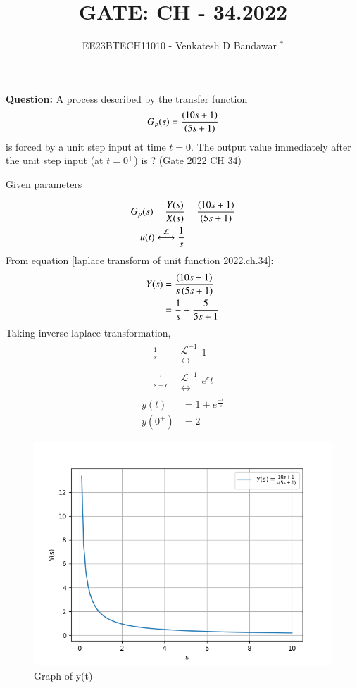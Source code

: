 \documentclass[journal,12pt,twocolumn]{IEEEtran}
\theoremstyle{remark}
\begin{document}

\vspace{3cm}

\title{GATE: CH - 34.2022}
\author{EE23BTECH11010 - Venkatesh D Bandawar $^{*}$%
}
\maketitle
\bigskip


\textbf{Question:} A process described by the transfer function
\begin{align}
    G_p(s) = \frac{\left(10s+1\right)}{\left(5s+1\right)} \nonumber
\end{align}
is forced by a unit step input at time $t = 0$. The output value immediately after the unit step input (at $t = 0^+$) is ? \hfill(Gate 2022 CH 34)\\
\solution
\begin{table}[!h] 
\centering

\caption{Given parameters}
\label{given parameters list.gate.2022.ch.34}
\end{table}
\begin{align}
    G_p(s) = \frac{Y(s)}{X(s)} &= \frac{\brak{10s+1}}{\brak{5s+1}}\\
    u(t) \system{\mathcal{L}} \frac{1}{s} \label{laplace transform of unit function 2022.ch.34}
\end{align}
From equation \eqref{laplace transform of unit function 2022.ch.34}:
\begin{align}
    Y(s) &= \frac{\left(10s+1\right)}{s\left(5s+1\right)}\\
    &= \frac{1}{s} + \frac{5}{5s+1}
\end{align}
Taking inverse laplace transformation, 
\begin{align}
    \frac{1}{s} &\mathrel{\substack{\mathcal{L}^{-1}\\\longleftrightarrow}} 1\\
    \frac{1}{s-c} &\mathrel{\substack{\mathcal{L}^{-1}\\\longleftrightarrow}} e^ct
\end{align}
\begin{align}
    y(t) &= 1 + e^{\frac{-t}{5}}\\
    y(0^+) &= 2
\end{align}

\begin{figure}[!h] 
    \centering
    \includegraphics[width=\columnwidth]{figs/Graph_of_y(s).png}
    \caption{Graph of y(t)}
    \label{fig:Graph1_gate_CE_30}
    \end{figure}
\end{document}
